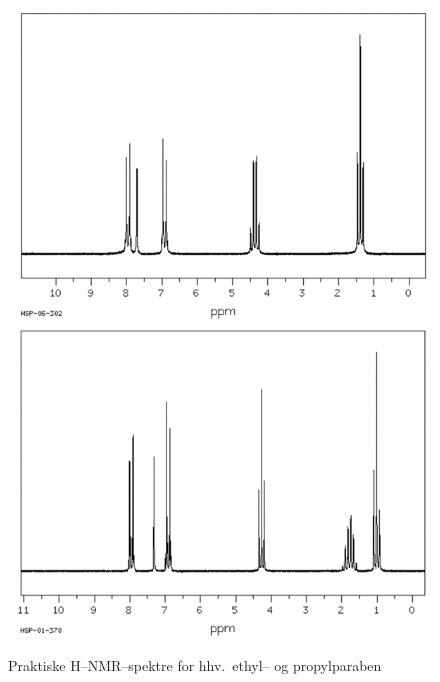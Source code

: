     \begin{figure}[H]\centering
        \includegraphics[width=.48\linewidth]{billeder/teonmrethyl}
        \includegraphics[width=.48\linewidth]{billeder/teonmrpropyl}
        \caption{Praktiske H--NMR--spektre for hhv.\ ethyl-- og propylparaben \parencite{SDBS}}
    \end{figure}

